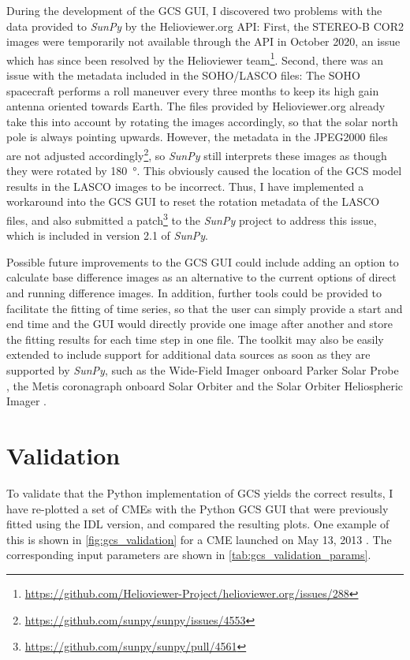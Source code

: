 During the development of the \ac{GCS} \ac{GUI}, I discovered two problems with the data provided to \textit{SunPy} by the Helioviewer.org API: First, the \ac{STEREO}-B COR2 images were temporarily not available through the API in October 2020, an issue which has since been resolved by the Helioviewer team\footnote{\url{https://github.com/Helioviewer-Project/helioviewer.org/issues/288}}. Second, there was an issue with the metadata included in the \ac{SOHO}/LASCO files: The \ac{SOHO} spacecraft performs a roll maneuver every three months to keep its high gain antenna oriented towards Earth. The files provided by Helioviewer.org already take this into account by rotating the images accordingly, so that the solar north pole is always pointing upwards. However, the metadata in the JPEG2000 files are not adjusted accordingly\footnote{\url{https://github.com/sunpy/sunpy/issues/4553}}, so \textit{SunPy} still interprets these images as though they were rotated by \SI{180}{\degree}. This obviously caused the location of the \ac{GCS} model results in the LASCO images to be incorrect. Thus, I have implemented a workaround into the \ac{GCS} \ac{GUI} to reset the rotation metadata of the LASCO files, and also submitted a patch\footnote{\url{https://github.com/sunpy/sunpy/pull/4561}} to the \textit{SunPy} project to address this issue, which is included in version 2.1 of \textit{SunPy}.

Possible future improvements to the \ac{GCS} \ac{GUI} could include adding an option to calculate base difference images as an alternative to the current options of direct and running difference images. In addition, further tools could be provided to facilitate the fitting of time series, so that the user can simply provide a start and end time and the \ac{GUI} would directly provide one image after another and store the fitting results for each time step in one file. The toolkit may also be easily extended to include support for additional data sources as soon as they are supported by \textit{SunPy}, such as the Wide-Field Imager onboard Parker Solar Probe \citep[WISPR,][]{Vourlidas-2016-WISPR}, the Metis coronagraph onboard Solar Orbiter \citep{Antonucci-2020-Metis} and the Solar Orbiter Heliospheric Imager \citep[SoloHI,][]{Howard-2020-SoloHI}.

\section{Validation}

To validate that the Python implementation of \ac{GCS} yields the correct results, I have re-plotted a set of \acp{CME}  with the Python \ac{GCS} \ac{GUI} that were previously fitted using the \ac{IDL} version, and compared the resulting plots. One example of this is shown in \autoref{fig:gcs_validation} for a \ac{CME} launched on May 13, 2013 \citep[originally reconstructed by][Figure 2]{Gou-2020}. The corresponding input parameters are shown in \autoref{tab:gcs_validation_params}.

